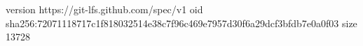version https://git-lfs.github.com/spec/v1
oid sha256:72071118717c1f818032514e38c7f96c469e7957d30f6a29dcf3bfdb7e0a0f03
size 13728
